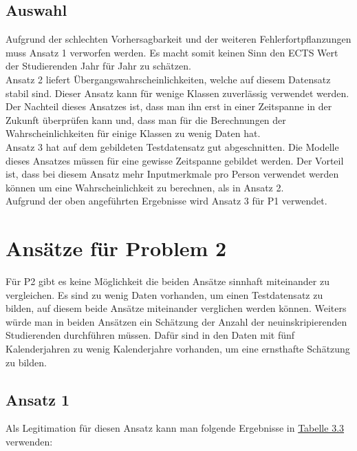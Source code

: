 \subsection{Auswahl}
Aufgrund der schlechten Vorhersagbarkeit und der weiteren Fehlerfortpflanzungen muss Ansatz 1 verworfen werden. Es macht somit keinen Sinn den ECTS Wert
der Studierenden Jahr f\"ur Jahr zu sch\"atzen. \\

Ansatz 2 liefert \"Ubergangswahrscheinlichkeiten, welche auf diesem Datensatz stabil sind. Dieser Ansatz kann f\"ur wenige Klassen zuverl\"assig verwendet werden.
Der Nachteil dieses Ansatzes ist, dass man ihn erst in einer Zeitspanne in der Zukunft \"uberpr\"ufen kann und, dass man f\"ur die Berechnungen der Wahrscheinlichkeiten
f\"ur einige Klassen zu wenig Daten hat. \\

Ansatz 3 hat auf dem gebildeten Testdatensatz gut abgeschnitten. Die Modelle dieses Ansatzes m\"ussen f\"ur eine gewisse Zeitspanne gebildet werden. Der Vorteil ist, dass
bei diesem Ansatz mehr Inputmerkmale pro Person verwendet werden k\"onnen um eine Wahrscheinlichkeit zu berechnen, als in Ansatz 2. \\

Aufgrund der oben angef\"uhrten Ergebnisse wird Ansatz 3 f\"ur P1 verwendet. \\








\section{Ans\"atze f\"ur Problem 2}
F\"ur P2 gibt es keine M\"oglichkeit die beiden Ans\"atze sinnhaft miteinander zu vergleichen. Es sind zu wenig Daten vorhanden,
um einen Testdatensatz zu bilden, auf diesem beide Ans\"atze miteinander verglichen werden k\"onnen. Weiters w\"urde man in beiden
Ans\"atzen ein Sch\"atzung der Anzahl der neuinskripierenden Studierenden durchf\"uhren m\"ussen. Daf\"ur sind in den Daten mit f\"unf Kalenderjahren
zu wenig Kalenderjahre vorhanden, um eine ernsthafte Sch\"atzung zu bilden.


\subsection{Ansatz 1}
Als Legitimation f\"ur diesen Ansatz kann man folgende Ergebnisse in \hyperref[tab:legitimationA1P2]{Tabelle 3.3} verwenden:

